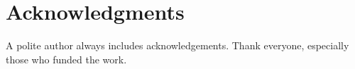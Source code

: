 \section{Acknowledgments}
A polite author always includes acknowledgements.  Thank everyone,
especially those who funded the work.
